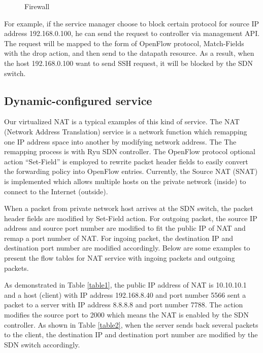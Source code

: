 \begin{figure}[!t]
  \centering
  \def\svgwidth{\linewidth}
  
  \caption{Firewall}
  \label{fig:fw_use}
\end{figure}

For example, if the service manager choose to block certain protocol for source IP address 192.168.0.100, he can send the request to controller via management API. The request will be mapped to the form of OpenFlow protocol, Match-Fields with the drop action, and then send to the datapath resource. As a result, when the host 192.168.0.100 want to send SSH request, it will be blocked by the SDN switch.

\subsection{Dynamic-configured service}

Our virtualized NAT is a typical examples of this kind of service. The NAT (Network Address Translation) service is a network function which remapping one IP address space into another by modifying network address.
The
The remapping process is  with Ryu SDN controller. The OpenFlow protocol
optional action “Set-Field” is employed to rewrite packet header fields to
easily convert the forwarding policy into OpenFlow entries. Currently, the
Source NAT (SNAT) is implemented which allows multiple hosts on the private
network (inside) to connect to the Internet (outside).

When a packet from private network host arrives at the SDN switch, the packet
header fields are modified  by Set-Field action. For outgoing packet, the
source IP address and source port number are modified to fit the public IP
of NAT and remap a port number of NAT. For ingoing packet, the destination
IP and destination port number are modified accordingly. Below are some
examples to present the flow tables for NAT service with ingoing packets
and outgoing packets.

As demonstrated in Table \ref{table1}, the public IP address of NAT is
10.10.10.1 and a host (client) with IP address 192.168.8.40 and port number
5566 sent a packet to a server with IP address 8.8.8.8 and port number 7788.
The action modifies the source port to 2000 which means the NAT is enabled by
the SDN controller. As shown in Table \ref{table2}, when the server sends back several
packets to the client, the destination IP and destination port number
are modified by the SDN switch accordingly.

